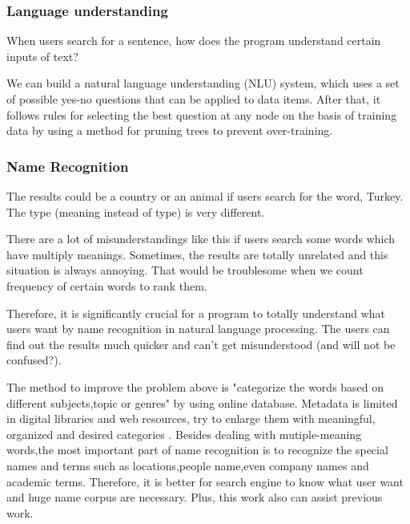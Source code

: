 \subsubsection*{Language understanding}
When users search for a sentence, how does the program understand certain inputs of text? 

We can build a natural language understanding (NLU) system, which uses a set of possible yes-no questions that can be applied to data items.  After that, it follows rules for selecting the best question at any node on the basis of training data by using a method for pruning trees to prevent over-training.


\subsubsection*{Name Recognition}

The results could be a country or an animal if users search for the word, Turkey. The type (meaning instead of type) is very different.

There are a lot of misunderstandings like this if users search some words which have multiply meanings. Sometimes, the results are totally unrelated and this situation is always annoying. That would be troublesome when we count frequency of certain words to rank them.
 
Therefore, it is significantly crucial for a program to totally understand what users want by name recognition in natural language processing. The users can find out the results much quicker and can't get misunderstood (and will not be confused?).

The method to improve the problem above is "categorize the words based on different subjects,topic or genres" by using online database. Metadata is limited in digital libraries and web resources, try to enlarge them with meaningful, organized and desired categories \cite{Kules2006}.
Besides dealing with mutiple-meaning words,the most important part of name recognition is to recognize the special names and terms such as locations,people name,even company names and academic terms. Therefore, it is better for search engine to know what user want and huge name corpus are necessary. Plus, this work also can assist previous work.




